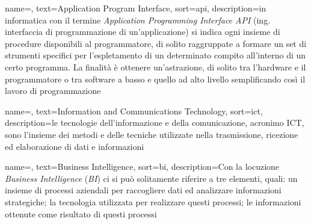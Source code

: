 
\renewcommand{\acronymname}{Acronimi e abbreviazioni}


    
    
	
	
	
	

\renewcommand{\glossaryname}{Glossario}

{
    name=,
    text=Application Program Interface,
    sort=api,
    description={in informatica con il termine \emph{Application Programming Interface API} (ing. interfaccia di programmazione di un'applicazione) si indica ogni insieme di procedure disponibili al programmatore, di solito raggruppate a formare un set di strumenti specifici per l'espletamento di un determinato compito all'interno di un certo programma. La finalità è ottenere un'astrazione, di solito tra l'hardware e il programmatore o tra software a basso e quello ad alto livello semplificando così il lavoro di programmazione}
}

{
	name=,
	text=Information and Communications Technology,
	sort=ict,
	description={le tecnologie dell'informazione e della comunicazione, acronimo ICT, sono l'insieme dei metodi e delle tecniche utilizzate nella trasmissione, ricezione ed elaborazione di dati e informazioni}
}

{
	name=,
	text=Business Intelligence,
	sort=bi,
	description={Con la locuzione \textit{Business Intelligence} (\textit{BI}) ci si può solitamente riferire a tre elementi, quali: un insieme di processi aziendali per raccogliere dati ed analizzare informazioni strategiche; la tecnologia utilizzata per realizzare questi processi; le informazioni ottenute come risultato di questi processi}
}

